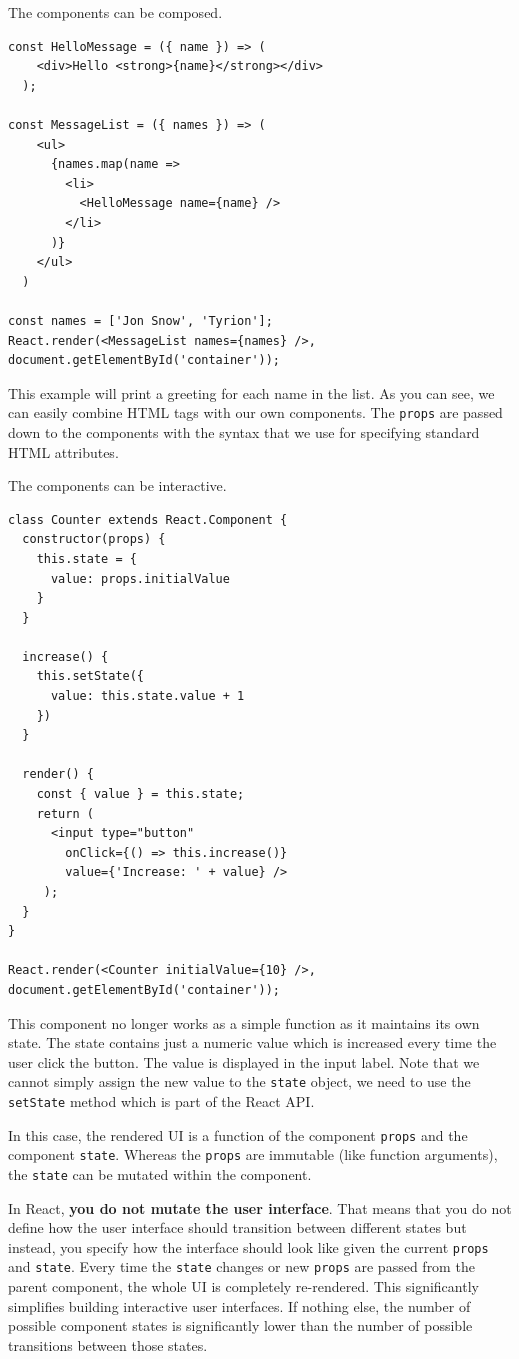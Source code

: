 The components can be composed. 

\begin{verbatim}
const HelloMessage = ({ name }) => (
    <div>Hello <strong>{name}</strong></div>
  );
  
const MessageList = ({ names }) => (
    <ul>
      {names.map(name => 
        <li>
          <HelloMessage name={name} />
        </li>
      )}
    </ul>
  )

const names = ['Jon Snow', 'Tyrion'];
React.render(<MessageList names={names} />, document.getElementById('container'));
\end{verbatim}

This example will print a greeting for each name in the list. As you can see, we can easily combine HTML tags with our own components. The \texttt{props} are passed down to the components with the syntax that we use for specifying  standard HTML attributes.

The components can be interactive.

\begin{verbatim}
class Counter extends React.Component {
  constructor(props) {
    this.state = {
      value: props.initialValue
    }
  }
  
  increase() {
    this.setState({
      value: this.state.value + 1
    })
  }
  
  render() {
    const { value } = this.state;
    return (
      <input type="button" 
        onClick={() => this.increase()} 
        value={'Increase: ' + value} />
     );
  }
} 

React.render(<Counter initialValue={10} />, document.getElementById('container'));
\end{verbatim}

This component no longer works as a simple function as it maintains its own state. The state contains just a numeric value which is increased every time the user click the button. The value is displayed in the input label. Note that we cannot simply assign the new value to the \texttt{state} object, we need to use the \texttt{setState} method which is part of the React API.

In this case, the rendered UI is a function of the component \texttt{props} and the component \texttt{state}. Whereas the \texttt{props} are immutable (like function arguments), the \texttt{state} can be mutated within the component.

In React, \textbf{you do not mutate the user interface}. That means that you do not define how the user interface should transition between different states but instead, you specify how the interface should look like given the current \texttt{props} and \texttt{state}. Every time the \texttt{state} changes or new \texttt{props} are passed from the parent component, the whole UI is completely re-rendered. This significantly simplifies building interactive user interfaces. If nothing else, the number of possible component states is significantly lower than the number of possible transitions between those states.

